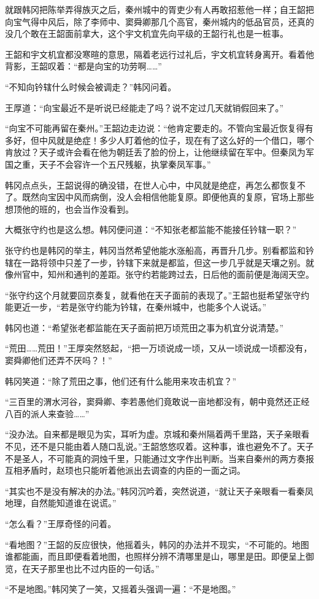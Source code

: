 就跟韩冈把陈举弄得族灭之后，秦州城中的胥吏少有人再敢招惹他一样；自王韶把向宝气得中风后，除了李师中、窦舜卿那几个高官，秦州城内的低品官员，还真的没几个敢在王韶面前拿大，这个宇文机宜先向平级的王韶行礼也是一桩事。

王韶和宇文机宜都没寒暄的意思，隔着老远行过礼后，宇文机宜转身离开。看着他背影，王韶叹着：“都是向宝的功劳啊……”

“不知向钤辖什么时候会被调走？”韩冈问着。

王厚道：“向宝最近不是听说已经能走了吗？说不定过几天就销假回来了。”

“向宝不可能再留在秦州。”王韶边走边说：“他肯定要走的。不管向宝最近恢复得有多好，但中风就是绝症！多少人盯着他的位子，现在有了这么好的一个借口，哪个肯放过？天子或许会看在他为朝廷丢了脸的份上，让他继续留在军中。但秦凤为军国之重，天子不会容许一个五尺残躯，执掌秦凤军事。”

韩冈点点头，王韶说得的确没错，在世人心中，中风就是绝症，再怎么都恢复不了。既然向宝因中风而病倒，没人会相信他能复原。即便他真的复原，官场上那些想顶他的班的，也会当作没看到。

大概张守约也是这么想。韩冈便问道：“不知张老都监能不能接任钤辖一职？”

张守约也是韩冈的举主，韩冈当然希望他能水涨船高，再晋升几步。别看都监和钤辖在一路将领中只差了一步，钤辖下来就是都监，但这一步几乎就是天壤之别。就像州官中，知州和通判的差距。张守约若能跨过去，日后他的面前便是海阔天空。

“张守约这个月就要回京奏复，就看他在天子面前的表现了。”王韶也挺希望张守约能更近一步，“若是张守约能为钤辖，在秦州城中，也能多个人说话。”

韩冈也道：“希望张老都监能在天子面前把万顷荒田之事为机宜分说清楚。”

“荒田……荒田！”王厚突然怒起，“把一万顷说成一顷，又从一顷说成一顷都没有，窦舜卿他们还弄不厌吗？！”

韩冈笑道：“除了荒田之事，他们还有什么能用来攻击机宜？”

“三百里的渭水河谷，窦舜卿、李若愚他们竟敢说一亩地都没有，朝中竟然还正经八百的派人来查验……”

“没办法。自来都是眼见为实，耳听为虚。京城和秦州隔着两千里路，天子亲眼看不见，还不是只能由着人随口乱说。”王韶悠悠叹着。这种事，谁也避免不了。天子不是圣人，不可能真的洞烛千里，只能通过文字作出判断。当来自秦州的两方奏报互相矛盾时，赵顼也只能听着他派出去调查的内臣的一面之词。

“其实也不是没有解决的办法。”韩冈沉吟着，突然说道，“就让天子亲眼看一看秦凤地理，自然能知道谁在说谎。”

“怎么看？”王厚奇怪的问着。

“看地图？”王韶的反应很快，他摇着头，韩冈的办法并不现实，“不可能的。地图谁都能画，而且即便看着地图，也照样分辨不清哪里是山，哪里是田。即便呈上御览，在天子那里也比不过内臣的一句话。”

“不是地图。”韩冈笑了一笑，又摇着头强调一遍：“不是地图。”

